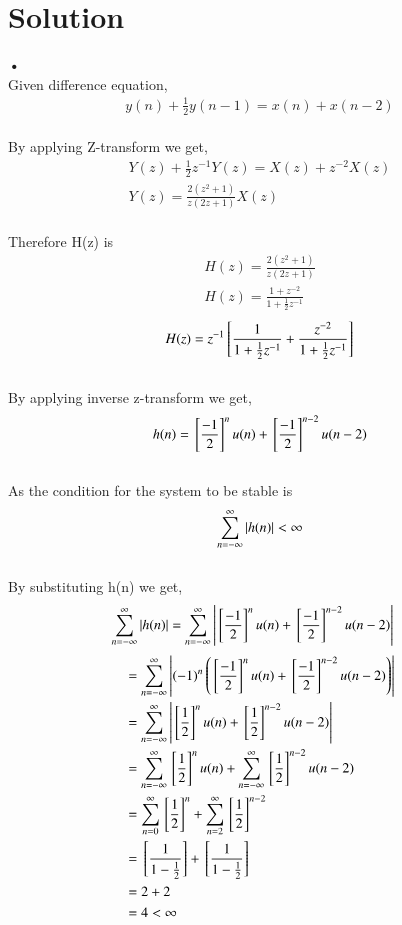 \documentclass[journal,12pt,twocolumn]{IEEEtran}
\begin{document}
\section{Solution}
\textbf{•}
\\
Given difference equation,
\begin{align}
y(n)+\frac{1}{2}y(n-1) = x(n)+x(n-2) 
\end{align}\\
By applying Z-transform we get, \\
\begin{align}
Y(z) + \frac{1}{2}z^{-1}Y(z)=X(z) + z^{-2}X(z)\\
Y(z)=\frac{2(z^2+1)}{z(2z+1)}X(z)
\end{align}\\
Therefore H(z) is \\
\begin{align}
H(z) = \frac{2(z^2+1)}{z(2z+1)} \\
H(z) = \frac{1+z^{-2}}{1+\frac{1}{2}z^{-1}}
\end{align}
\begin{align}
H(z)= z^{-1}{}\left[\frac{1}{1+\frac{1}{2}z^{-1}} + \frac{z^{-2}}{1+\frac{1}{2}z^{-1}}\right]
\end{align}\\
By applying inverse z-transform we get,\\
\begin{align}
    h(n)={}\left[\frac{-1}{2}\right]^nu(n) + {}\left[\frac{-1}{2}\right]^{n-2}u(n-2)
\end{align}\\
As the condition for the system to be stable is
\begin{align}
\sum_{n=-\infty}^{\infty} \left\vert h(n)\right\vert < \infty
\end{align}\\
By substituting h(n) we get,\\
\begin{align}
\sum_{n=-\infty}^{\infty} \left\vert h(n)\right\vert &= \sum_{n=-\infty}^{\infty}\left\vert{}\left[\frac{-1}{2}\right]^nu(n) + {}\left[\frac{-1}{2}\right]^{n-2}u(n-2)\right\vert
\end{align}
\begin{align}
&= 
\sum_{n=-\infty}^{\infty}\left\vert(-1)^n \left( {}\left[\frac{-1}{2}\right]^nu(n) + {}\left[\frac{-1}{2}\right]^{n-2}u(n-2) \right)\right\vert  \\
&= 
\sum_{n=-\infty}^{\infty}\left\vert{}\left[\frac{1}{2}\right]^nu(n) + {}\left[\frac{1}{2}\right]^{n-2}u(n-2)\right\vert \\
&=
\sum_{n=-\infty}^{\infty}{}\left[\frac{1}{2}\right]^nu(n)+\sum_{n=-\infty}^{\infty}{}\left[\frac{1}{2}\right]^{n-2}u(n-2)\\
&=
\sum_{n=0}^{\infty}{}\left[\frac{1}{2}\right]^n+\sum_{n=2}^{\infty}{}\left[\frac{1}{2}\right]^{n-2}\\
&=
{}\left[\frac{1}{1-\frac{1}{2}}\right]+{}\left[\frac{1}{1-\frac{1}{2}}\right]\\
&=
2+2\\
&=
4 < \infty
\end{align}\\
\end{document}
